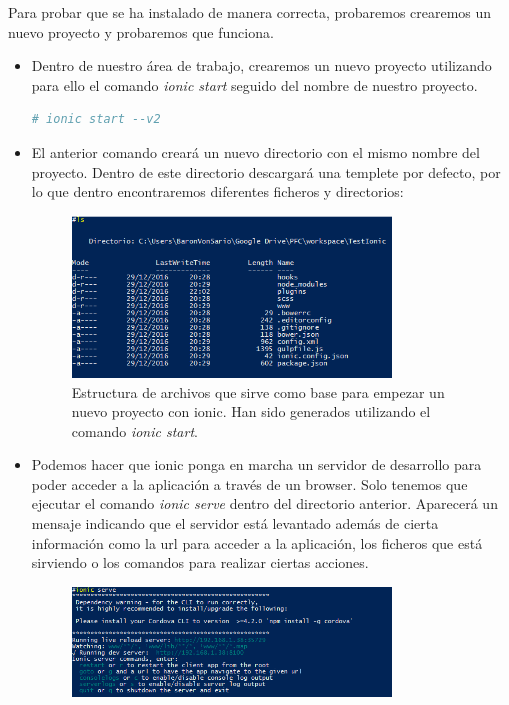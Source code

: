 Para probar que se ha instalado de manera correcta, probaremos crearemos un nuevo proyecto y probaremos que funciona.
\begin{itemize}
  \item Dentro de nuestro área de trabajo, crearemos un nuevo proyecto utilizando para ello el comando \emph{ionic start} seguido del nombre de nuestro proyecto.
  \begin{lstlisting}[language=bash]
    # ionic start --v2
  \end{lstlisting}
  \item El anterior comando creará un nuevo directorio con el mismo nombre del proyecto. Dentro de este directorio descargará una templete por defecto, por lo que dentro encontraremos diferentes ficheros y directorios:
  \begin{figure}[H]
\centering
    \includegraphics[width=0.8\textwidth]{Figures/anexo/anexoI/ionic/ionic_start}
    \caption{Estructura de archivos que sirve como base para empezar un nuevo proyecto con ionic. Han sido generados utilizando el comando \emph{ionic start}.}
  \end{figure}
  \item Podemos hacer que ionic ponga en marcha un servidor de desarrollo para poder acceder a la aplicación a través de un browser. Solo tenemos que ejecutar el comando \emph{ionic serve} dentro del directorio anterior. Aparecerá un mensaje indicando que el servidor está levantado además de cierta información como la url para acceder a la aplicación, los ficheros que está sirviendo o los comandos para realizar ciertas acciones.
  \begin{figure}[H]
\centering
    \includegraphics[width=0.8\textwidth]{Figures/anexo/anexoI/ionic/ionic_serve}

\end{figure}
\end{itemize}
